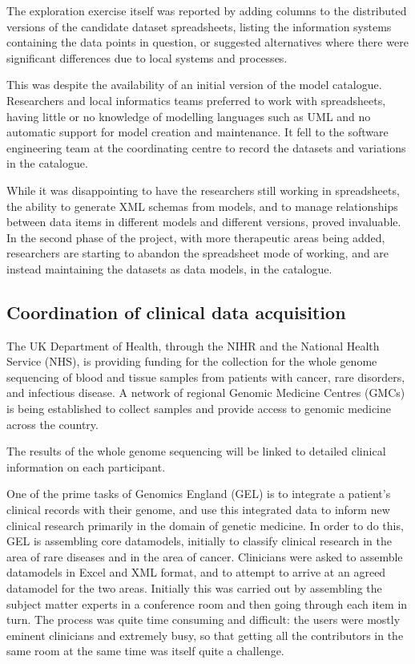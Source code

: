 The exploration exercise itself was reported by adding columns to the
distributed versions of the candidate dataset spreadsheets, listing
the information systems containing the data points in question, or
suggested alternatives where there were significant differences due to
local systems and processes.

This was despite the availability of an initial version of the model
catalogue.  Researchers and local informatics teams preferred to work
with spreadsheets, having little or no knowledge of modelling
languages such as UML and no automatic support for model creation and
maintenance.  It fell to the software engineering team at the
coordinating centre to record the datasets and variations in the
catalogue.

While it was disappointing to have the researchers still working in
spreadsheets, the ability to generate XML schemas from models, and to
manage relationships between data items in different models and
different versions, proved invaluable.  In the second phase of the
project, with more therapeutic areas being added, researchers are
starting to abandon the spreadsheet mode of working, and are instead
maintaining the datasets as data models, in the catalogue.

\subsection{Coordination of clinical data acquisition}

The UK Department of Health, through the NIHR and the National Health
Service (NHS), is providing funding for the collection for the whole
genome sequencing of blood and tissue samples from patients with
cancer, rare disorders, and infectious disease.  A network of regional
Genomic Medicine Centres (GMCs) is being established to collect
samples and provide access to genomic medicine across the country.  

The results of the whole genome sequencing will be linked to detailed
clinical information on each participant.  

One of the prime tasks of Genomics England (GEL) is to integrate a
patient's clinical records with their genome, and use this integrated
data to inform new clinical research primarily in the domain of
genetic medicine. In order to do this, GEL is assembling core
datamodels, initially to classify clinical research in the area of
rare diseases and in the area of cancer.  Clinicians were asked to
assemble datamodels in Excel and XML format, and to attempt to arrive
at an agreed datamodel for the two areas.  Initially this was carried
out by assembling the subject matter experts in a conference room and
then going through each item in turn. The process was quite time
consuming and difficult: the users were mostly eminent clinicians and
extremely busy, so that getting all the contributors in the same room
at the same time was itself quite a challenge.

